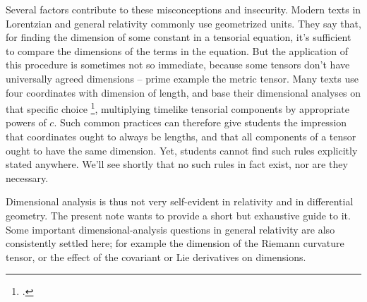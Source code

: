 \documentclass[\ifafour a4paper,12pt,\else a5paper,10pt,\fi%
onecolumn,oneside,article,%
british%
]{memoir}
\theoremstyle{remark}
\theoremstyle{innote}
\newcommand*{\citep}{\footcites}
\renewcommand*{\|}[1][]{\nonscript\,#1\vert\nonscript\;\mathopen{}}
\newcommand*{\sect}{\S}%
\newcommand*{\eqn}{eq.}%
\newcommand*{\eg}{{e.g.}}
\begin{document}
Several factors contribute to these misconceptions and insecurity. Modern
texts in Lorentzian and general relativity commonly use geometrized units.
They say that, for finding the dimension of some constant in a tensorial
equation, it's sufficient to compare the dimensions of the terms in the
equation. But the application of this procedure is sometimes not so
immediate, because some tensors don't have universally agreed dimensions --
prime example the metric tensor. Many texts use four coordinates with
dimension of length, and base their dimensional analyses on that specific
choice \citep[\eg][p.~71 \eqn~(37.1)]{tolman1934_t1949}[p.~80
\eqn~(32.15)]{landauetal1939_t1996}[for exceptions with coordinates with mixed dimensions see \eg][\sect~V.55]{fock1955_t1964}[\sect~4.1]{mcvittie1956_r1965}[\sect~VII.1]{fokker1960_t1965}[\sect~F.III.280]{truesdelletal1960}[\sect~X]{kitano2013},%
multiplying timelike tensorial components by appropriate powers of $c$.
Such common practices can therefore give students the impression that
coordinates ought to always be lengths, and that all components of a tensor
ought to have the same dimension. Yet, students cannot find such rules
explicitly stated anywhere. We'll see shortly that no such rules in fact
exist, nor are they necessary.

\medskip

Dimensional analysis is thus not very self-evident in relativity and in
differential geometry. The present note wants to provide a short but
exhaustive guide to it.
Some important dimensional-analysis questions in general relativity are
also consistently settled here; for example the dimension of the Riemann
curvature tensor, or the effect of the covariant or Lie derivatives on
dimensions.
\end{document}
